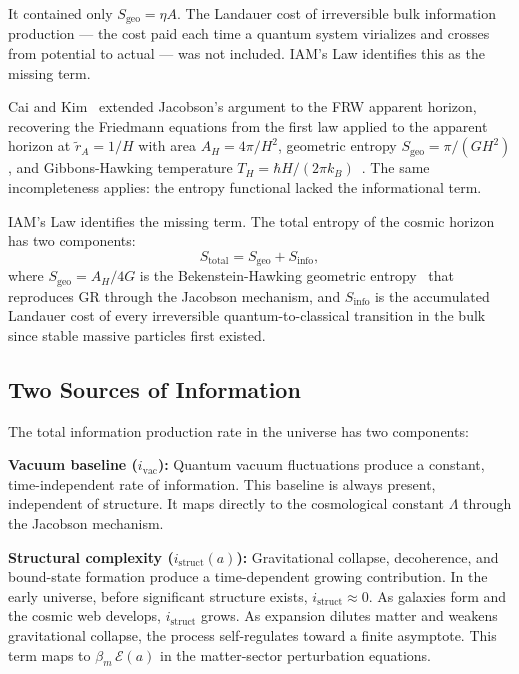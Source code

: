 \documentclass[12pt,a4paper]{article}
\begin{document}
 It contained only $S_\mathrm{geo}
= \eta A$. The Landauer cost of irreversible bulk information production
--- the cost paid each time a quantum system virializes and crosses from
potential to actual --- was not included. IAM's Law identifies this as
the missing term.

Cai and Kim~\citep{CaiKim2005} extended Jacobson's argument to the FRW
apparent horizon, recovering the Friedmann equations from the first
law applied to the apparent horizon at $\tilde{r}_A = 1/H$ with
area $A_H = 4\pi/H^2$, geometric entropy $S_\mathrm{geo} =
\pi/(GH^2)$, and Gibbons-Hawking temperature $T_H = \hbar H/(2\pi
k_B)$~\citep{Gibbons1977}. The same incompleteness applies: the
entropy functional lacked the informational term.

IAM's Law identifies the missing term. The total entropy of the
cosmic horizon has two components:
\begin{equation}
S_\mathrm{total} = S_\mathrm{geo} + S_\mathrm{info},
\label{eq:Stotal}
\end{equation}
where $S_\mathrm{geo} = A_H/4G$ is the Bekenstein-Hawking geometric
entropy~\citep{Bekenstein1973,Hawking1975} that reproduces GR through
the Jacobson mechanism, and $S_\mathrm{info}$ is the accumulated
Landauer cost of every irreversible quantum-to-classical transition
in the bulk since stable massive particles first existed.

\subsection{Two Sources of Information}

The total information production rate in the universe has two
components:

\textbf{Vacuum baseline ($i_\mathrm{vac}$):} Quantum vacuum
fluctuations produce a constant, time-independent rate of information.
This baseline is always present, independent of structure. It maps
directly to the cosmological constant $\Lambda$ through the Jacobson
mechanism.

\textbf{Structural complexity ($i_\mathrm{struct}(a)$):} Gravitational
collapse, decoherence, and bound-state formation produce a
time-dependent growing contribution. In the early universe, before
significant structure exists, $i_\mathrm{struct} \approx 0$. As
galaxies form and the cosmic web develops, $i_\mathrm{struct}$ grows.
As expansion dilutes matter and weakens gravitational collapse, the
process self-regulates toward a finite asymptote. This term maps to
$\beta_m\,\mathcal{E}(a)$ in the matter-sector perturbation equations.
\end{document}

